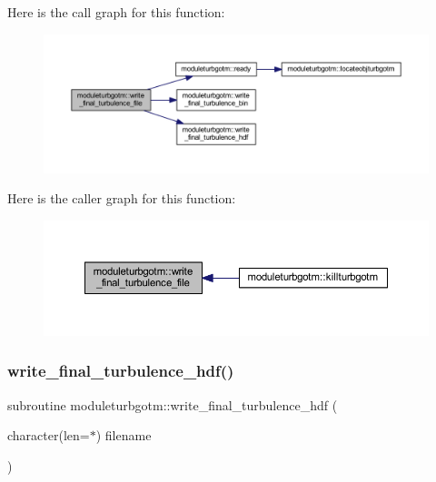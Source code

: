 Here is the call graph for this function\+:\nopagebreak
\begin{figure}[H]
\begin{center}
\leavevmode
\includegraphics[width=350pt]{namespacemoduleturbgotm_a01feda969236095bbd86a65a94f4e37c_cgraph}
\end{center}
\end{figure}
Here is the caller graph for this function\+:\nopagebreak
\begin{figure}[H]
\begin{center}
\leavevmode
\includegraphics[width=350pt]{namespacemoduleturbgotm_a01feda969236095bbd86a65a94f4e37c_icgraph}
\end{center}
\end{figure}
\mbox{\label{namespacemoduleturbgotm_afdd63df0733f254a488fb73b240eb944}} 
\subsubsection{\texorpdfstring{write\+\_\+final\+\_\+turbulence\+\_\+hdf()}{write\_final\_turbulence\_hdf()}}
{\footnotesize\ttfamily subroutine moduleturbgotm\+::write\+\_\+final\+\_\+turbulence\+\_\+hdf (\begin{DoxyParamCaption}\item[{character(len=$\ast$)}]{filename }\end{DoxyParamCaption})\hspace{0.3cm}{\ttfamily [private]}}

